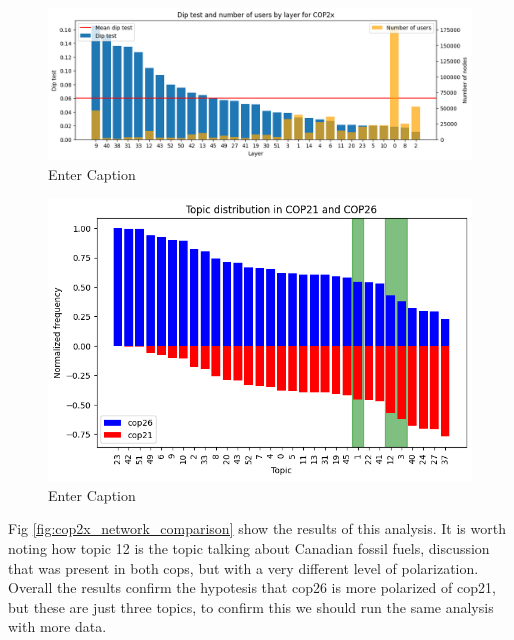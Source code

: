 \begin{figure}[H]
    \centering
    \includegraphics[width=0.8\linewidth]{Chapter5//figures/diptest_cop2x.png}
    \caption{Enter Caption}
    \label{fig:diptesto cop2x}
\end{figure}

\begin{figure}[H]
    \centering
    \includegraphics[width=0.8\linewidth]{Chapter5/figures/cop21vscop26.png}
    \caption{Enter Caption}
    \label{fig:2126_share}
\end{figure}

Fig \ref{fig:cop2x_network_comparison} show the results of this analysis. It is worth noting how topic 12 is the topic talking about Canadian fossil fuels, discussion that was present in both cops, but with a very different level of polarization. Overall the results confirm the hypotesis that cop26 is more polarized of cop21, but these are just three topics, to confirm this we should run the same analysis with more data.

